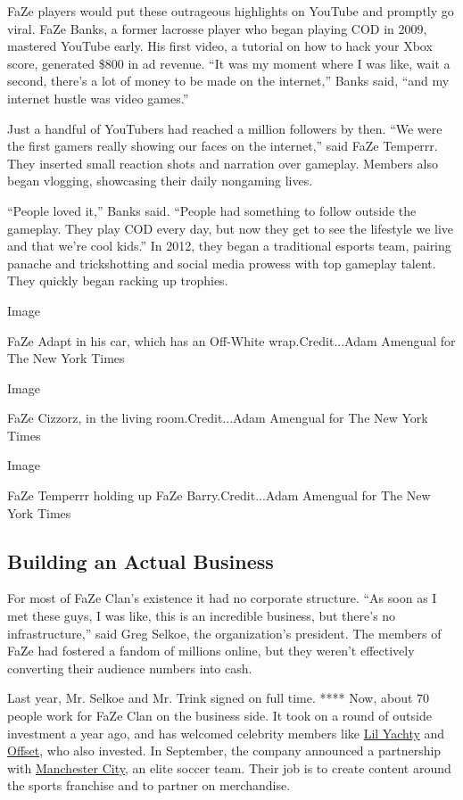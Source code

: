 FaZe players would put these outrageous highlights on YouTube and
promptly go viral. FaZe Banks, a former lacrosse player who began
playing COD in 2009, mastered YouTube early. His first video, a tutorial
on how to hack your Xbox score, generated \$800 in ad revenue. ``It was
my moment where I was like, wait a second, there's a lot of money to be
made on the internet,'' Banks said, ``and my internet hustle was video
games.''

Just a handful of YouTubers had reached a million followers by then.
``We were the first gamers really showing our faces on the internet,''
said FaZe Temperrr. They inserted small reaction shots and narration
over gameplay. Members also began vlogging, showcasing their daily
nongaming lives.

``People loved it,'' Banks said. ``People had something to follow
outside the gameplay. They play COD every day, but now they get to see
the lifestyle we live and that we're cool kids.'' In 2012, they began a
traditional esports team, pairing panache and trickshotting and social
media prowess with top gameplay talent. They quickly began racking up
trophies.

Image

FaZe Adapt in his car, which has an Off-White wrap.Credit...Adam
Amengual for The New York Times

Image

FaZe Cizzorz, in the living room.Credit...Adam Amengual for The New York
Times

Image

FaZe Temperrr holding up FaZe Barry.Credit...Adam Amengual for The New
York Times

\hypertarget{building-an-actual-business}{%
\subsection{Building an Actual
Business}\label{building-an-actual-business}}

For most of FaZe Clan's existence it had no corporate structure. ``As
soon as I met these guys, I was like, this is an incredible business,
but there's no infrastructure,'' said Greg Selkoe, the organization's
president. The members of FaZe had fostered a fandom of millions online,
but they weren't effectively converting their audience numbers into
cash.

Last year, Mr. Selkoe and Mr. Trink signed on full time. **** Now, about
70 people work for FaZe Clan on the business side. It took on a round of
outside investment a year ago, and has welcomed celebrity members like
\href{https://www.tubefilter.com/2018/12/19/faze-clan-lil-yachty-faze-boat-youtube/}{Lil
Yachty} and
\href{https://www.theverge.com/2019/8/28/20835760/offset-migos-faze-clan-esports-gaming-interview}{Offset},
who also invested. In September, the company announced a partnership
with
\href{https://www.theverge.com/2019/9/26/20885136/faze-clan-manchester-city-esports-partnership}{Manchester
City}, an elite soccer team. Their job is to create content around the
sports franchise and to partner on merchandise.

